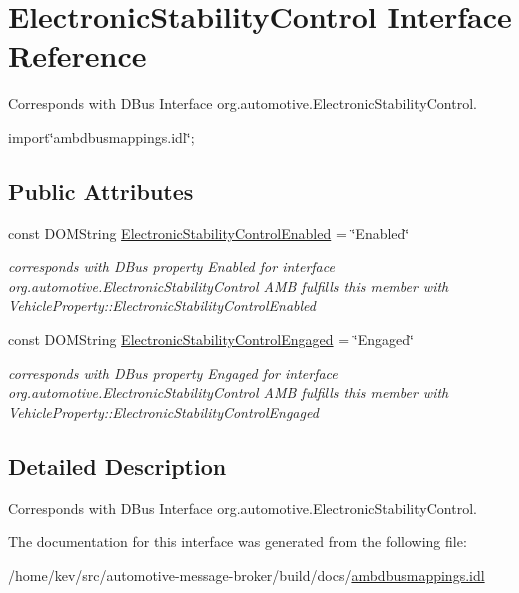 \hypertarget{interfaceElectronicStabilityControl}{\section{Electronic\+Stability\+Control Interface Reference}
\label{interfaceElectronicStabilityControl}
}


Corresponds with D\+Bus Interface org.\+automotive.\+Electronic\+Stability\+Control.  




{\ttfamily import\char`\"{}ambdbusmappings.\+idl\char`\"{};}

\subsection*{Public Attributes}
\begin{DoxyCompactItemize}
\item 
\hypertarget{interfaceElectronicStabilityControl_ac3d84aeef9a83ecbe089b3410a3d0b56}{const D\+O\+M\+String \hyperlink{interfaceElectronicStabilityControl_ac3d84aeef9a83ecbe089b3410a3d0b56}{Electronic\+Stability\+Control\+Enabled} = \char`\"{}Enabled\char`\"{}}\label{interfaceElectronicStabilityControl_ac3d84aeef9a83ecbe089b3410a3d0b56}

\begin{DoxyCompactList}\small\item\em corresponds with D\+Bus property Enabled for interface org.\+automotive.\+Electronic\+Stability\+Control A\+M\+B fulfills this member with Vehicle\+Property\+::\+Electronic\+Stability\+Control\+Enabled \end{DoxyCompactList}\item 
\hypertarget{interfaceElectronicStabilityControl_a9932a7220a5f9ef38d1ec59a0883c331}{const D\+O\+M\+String \hyperlink{interfaceElectronicStabilityControl_a9932a7220a5f9ef38d1ec59a0883c331}{Electronic\+Stability\+Control\+Engaged} = \char`\"{}Engaged\char`\"{}}\label{interfaceElectronicStabilityControl_a9932a7220a5f9ef38d1ec59a0883c331}

\begin{DoxyCompactList}\small\item\em corresponds with D\+Bus property Engaged for interface org.\+automotive.\+Electronic\+Stability\+Control A\+M\+B fulfills this member with Vehicle\+Property\+::\+Electronic\+Stability\+Control\+Engaged \end{DoxyCompactList}\end{DoxyCompactItemize}


\subsection{Detailed Description}
Corresponds with D\+Bus Interface org.\+automotive.\+Electronic\+Stability\+Control. 

The documentation for this interface was generated from the following file\+:\begin{DoxyCompactItemize}
\item 
/home/kev/src/automotive-\/message-\/broker/build/docs/\hyperlink{ambdbusmappings_8idl}{ambdbusmappings.\+idl}\end{DoxyCompactItemize}
